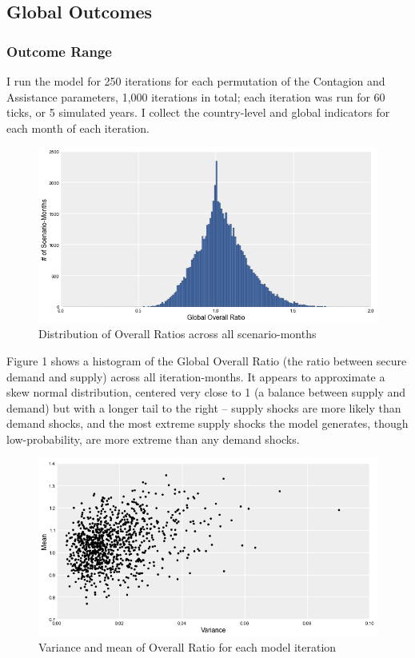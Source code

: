 \documentclass{llncs}
\begin{document}
\subsection{Global Outcomes}

\subsubsection{Outcome Range}

I run the model for 250 iterations for each permutation of the Contagion and Assistance parameters, 1,000 iterations in total; each iteration was run for 60 ticks, or 5 simulated years. I collect the country-level and global indicators for each month of each iteration. 

\begin{figure}[h!]
	\centering
	\includegraphics[width=\textwidth]{../Graphics/OverallDistribution}
	\caption{Distribution of Overall Ratios across all scenario-months}

\end{figure}

Figure 1 shows a histogram of the Global Overall Ratio (the ratio between secure demand and supply) across all iteration-months. It appears to approximate a skew normal distribution, centered very close to 1 (a balance between supply and demand) but with a longer tail to the right -- supply shocks are more likely than demand shocks, and the most extreme supply shocks the model generates, though low-probability, are more extreme than any demand shocks. 

\begin{figure}[h!]
	\centering
	\includegraphics[width=\textwidth]{../Graphics/OverallVarMeanScatter}
	\caption{Variance and mean of Overall Ratio for each model iteration}
\end{figure}
\end{document}
